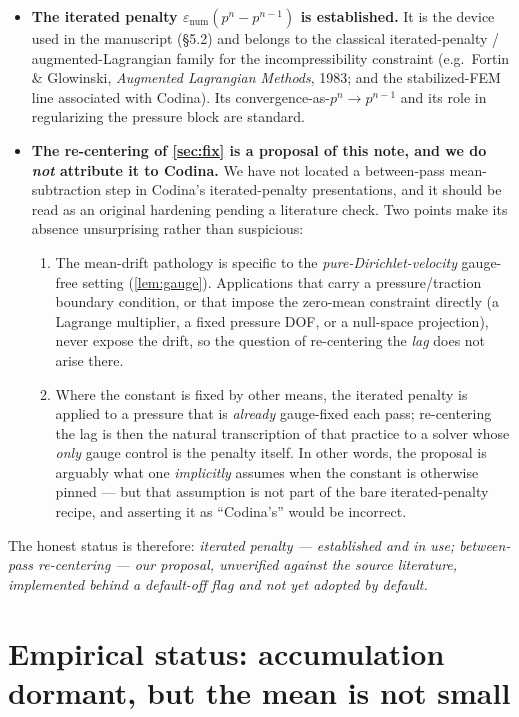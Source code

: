 \documentclass[11pt]{article}
\theoremstyle{plain}
\theoremstyle{remark}
\newcommand{\enum}{\varepsilon_{\mathrm{num}}}
\begin{document}
\begin{itemize}
\item \textbf{The iterated penalty $\enum(p^{n}-p^{n-1})$ is established.} It is the device used in the
manuscript (\S5.2) and belongs to the classical iterated-penalty / augmented-Lagrangian family for the
incompressibility constraint (e.g.\ Fortin \& Glowinski, \emph{Augmented Lagrangian Methods}, 1983; and
the stabilized-FEM line associated with Codina). Its convergence-as-$p^{n}\!\to\!p^{n-1}$ and its role in
regularizing the pressure block are standard.

\item \textbf{The re-centering of \cref{sec:fix} is a proposal of this note, and we do \emph{not}
attribute it to Codina.} We have not located a between-pass mean-subtraction step in Codina's
iterated-penalty presentations, and it should be read as an original hardening pending a literature
check. Two points make its absence unsurprising rather than suspicious:
\begin{enumerate}
\item[(a)] The mean-drift pathology is specific to the \emph{pure-Dirichlet-velocity} gauge-free setting
(\cref{lem:gauge}). Applications that carry a pressure/traction boundary condition, or that impose the
zero-mean constraint directly (a Lagrange multiplier, a fixed pressure DOF, or a null-space projection),
never expose the drift, so the question of re-centering the \emph{lag} does not arise there.
\item[(b)] Where the constant is fixed by other means, the iterated penalty is applied to a pressure that
is \emph{already} gauge-fixed each pass; re-centering the lag is then the natural transcription of that
practice to a solver whose \emph{only} gauge control is the penalty itself. In other words, the proposal
is arguably what one \emph{implicitly} assumes when the constant is otherwise pinned --- but that
assumption is not part of the bare iterated-penalty recipe, and asserting it as ``Codina's'' would be
incorrect.
\end{enumerate}
\end{itemize}

\noindent
The honest status is therefore: \emph{iterated penalty --- established and in use; between-pass
re-centering --- our proposal, unverified against the source literature, implemented behind a
default-off flag and not yet adopted by default.}

\section{Empirical status: accumulation dormant, but the mean is not small}
\label{sec:empirical}
\end{document}
